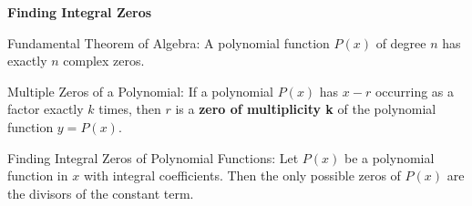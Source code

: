 
\begin{center}
\textbf{Finding Integral Zeros 
}
\end{center}

\vspce 

Fundamental Theorem of Algebra: A polynomial function $P(x) $ of degree $n$ has exactly $n$ complex zeros. 

\vspce 

Multiple Zeros of a Polynomial: If a polynomial $P(x)$ has $x-r$ occurring as a factor exactly $k$ times, then $r$ is a \textbf{zero of multiplicity k} of the polynomial function $y=P(x) $. 

\vspce 

Finding Integral Zeros of Polynomial Functions: Let $P(x) $ be a polynomial function in $x$ with integral coefficients. Then the only possible zeros of $P(x)$ are the divisors of the constant term. 





